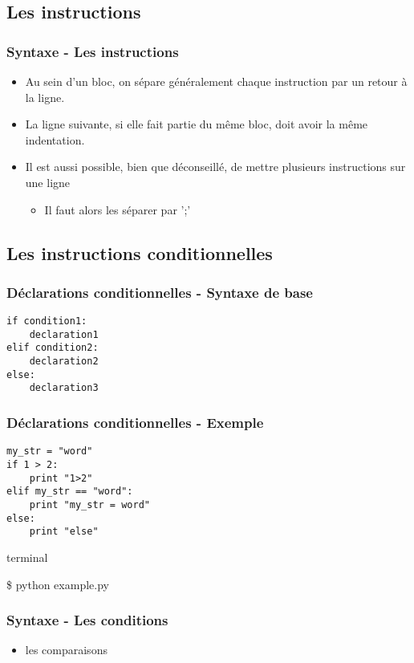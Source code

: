 \subsection{Les instructions}
\begin{frame}
  \frametitle{Syntaxe - Les instructions}
  \begin{itemize}
    \item<1-> Au sein d'un bloc, on sépare généralement chaque instruction par un retour à la ligne.
    \item<2-> La ligne suivante, si elle fait partie du même bloc, doit avoir la même indentation.
    \item<3-> Il est aussi possible, bien que déconseillé, de mettre plusieurs instructions sur une ligne
    \begin{itemize}
      \item<4-> Il faut alors les séparer par ';'
    \end{itemize}
  \end{itemize}
\end{frame}

\subsection{Les instructions conditionnelles}
\begin{frame}[fragile]
  \frametitle{Déclarations conditionnelles - Syntaxe de base}
  \begin{lstlisting}
if condition1:
    declaration1
elif condition2:
    declaration2
else:
    declaration3
  \end{lstlisting}
\end{frame}

\begin{frame}[fragile]
  \frametitle{Déclarations conditionnelles - Exemple}
  \begin{lstlisting}
my_str = "word"
if 1 > 2:
    print "1>2"
elif my_str == "word":
    print "my_str = word"
else:
    print "else"
  \end{lstlisting}

  \begin{beamercolorbox}{terminal}
  \begin{semiverbatim}
 \$ python example.py
  \end{semiverbatim}
  \end{beamercolorbox}

\end{frame}

\begin{frame}[fragile]
  \frametitle{Syntaxe - Les conditions}
  \begin{itemize}
    \item les comparaisons
  \end{itemize}
  \begin{ipython}
  \end{ipython}
\end{frame}

